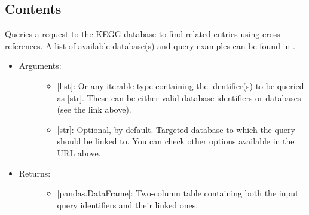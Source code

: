 \documentclass[letterpaper,10pt,english]{sphinxmanual}
\begin{document}
\subsection{Contents}
\label{\detokenize{databases:contents}}

\begin{fulllineitems}
\label{\detokenize{databases:data_tools.databases.kegg_link}}
Queries a request to the KEGG database to find related entries using
cross-references. A list of available database(s) and query examples
can be found in .
\begin{itemize}
\item {} \begin{description}
\item[{Arguments:}] \leavevmode\begin{itemize}
\item {} 
 {[}list{]}: Or any iterable type containing the
identifier(s) to be queried as {[}str{]}. These can be either
valid database identifiers or databases  (see the link
above).

\item {} 
 {[}str{]}: Optional,  by default. Targeted
database to which the query should be linked to. You can check
other options available in the URL above.

\end{itemize}

\end{description}

\item {} \begin{description}
\item[{Returns:}] \leavevmode\begin{itemize}
\item {} 
{[}pandas.DataFrame{]}: Two-column table containing both the
input query identifiers and their linked ones.

\end{itemize}

\end{description}


\end{itemize}
\end{fulllineitems}
\end{document}
